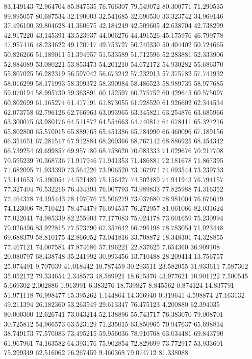 83.149143
72.964704
85.847535
76.766307
79.549072
80.300771
71.290535
89.895057
80.687534
32.190003
32.541685
32.690530
33.323742
34.969146
37.496100
39.804628
41.360675
42.184249
42.509605
42.638704
42.738299
42.917220
43.145391
43.523937
44.006276
44.491526
45.175976
46.799778
47.957416
48.234622
49.120717
49.753727
50.240330
50.404402
50.724665
50.826266
51.189011
51.394957
51.533589
51.712596
52.283881
52.333906
52.884089
53.080221
53.853473
54.201210
54.672172
54.930282
55.686370
55.807025
56.282319
56.597042
56.673242
57.232913
57.375782
57.741932
58.016299
58.171993
58.399372
58.390984
58.486523
58.989739
58.977685
59.070194
58.995730
59.363891
60.152597
60.275752
60.429645
60.575097
60.802699
61.165274
61.477191
61.873055
61.928520
61.926602
62.344534
62.073758
62.796126
62.766963
63.093965
63.345821
63.254876
63.685966
63.300075
63.980176
64.511872
64.554663
64.740817
64.678411
65.327216
65.802800
65.570015
65.889765
65.451386
65.784990
66.460096
67.189156
66.354651
67.281517
67.912884
68.260366
68.767142
68.886925
68.454342
66.739254
69.699857
69.957180
68.758620
70.083333
71.029676
70.217708
70.595239
70.368736
71.917946
71.941353
71.486881
72.181678
71.867395
71.682095
71.933390
73.564226
73.906520
73.167971
74.093544
73.239733
73.141653
75.190054
74.521489
75.156427
74.502489
74.941943
76.794157
77.327404
76.532216
76.434393
76.007793
73.989833
77.825988
74.316352
77.464378
74.195443
78.197076
75.506279
73.037680
78.981004
76.676619
74.123006
78.710421
78.474479
76.694537
76.272957
81.061066
82.031624
77.022641
74.985339
82.255903
77.177083
75.024178
73.601659
75.230994
79.026496
83.922815
77.523790
67.357642
66.795198
78.783054
71.023448
69.688379
58.810175
42.866052
73.041816
33.708872
18.348301
74.328855
77.467121
74.007584
47.874686
57.196221
22.837625
7.654360
36.909108
20.080797
68.438748
35.241992
30.993456
13.710488
28.209414
13.756757
25.074491
9.707039
41.018442
10.787459
30.293511
23.582055
31.933611
7.587302
35.052172
79.334654
2.348573
48.589921
18.615376
43.977621
10.901122
7.500545
5.669302
2.002886
1.913991
6.383276
18.739827
8.845562
0.874324
14.837791
51.971118
76.998477
15.395262
1.144864
14.366940
0.319641
4.598874
27.163132
49.211394
26.182360
53.263549
29.613347
76.475123
4.200880
62.394035
80.000300
12.626741
73.043214
52.138896
55.743717
76.383070
79.008701
30.725812
54.966573
63.523129
71.235015
63.850965
70.947637
65.698834
38.749173
77.570083
73.495215
59.956036
78.910708
63.034481
69.843790
61.967961
74.163582
64.393176
75.902854
72.829699
73.772917
53.933601
75.299349
62.516062
76.267459
9.460368
79.074712
81.338088
